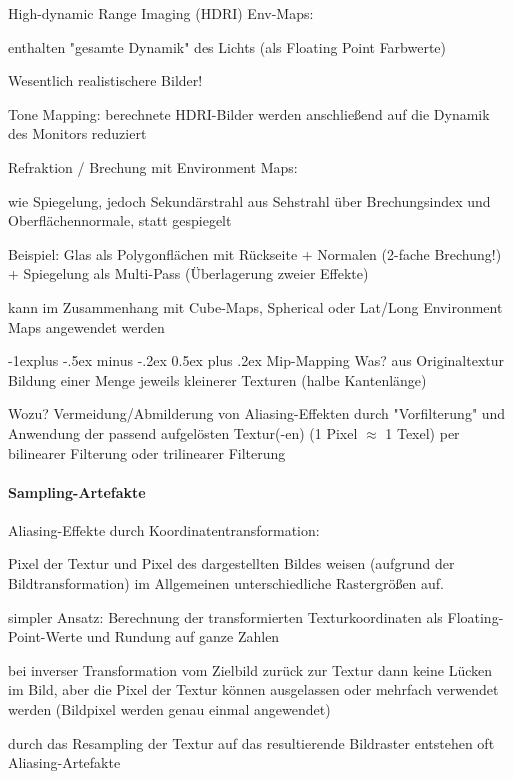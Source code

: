 \documentclass[landscape]{article}
\makeatletter
\renewcommand{\subsection}{\@startsection{subsection}{2}{0mm}%
                                {-1explus -.5ex minus -.2ex}%
                                {0.5ex plus .2ex}%
                                {\normalfont\normalsize\bfseries}}
\makeatother
\begin{document}
\begin{multicols}{3}
  
  High-dynamic Range Imaging (HDRI) Env-Maps:
  \begin{itemize*}
    \item enthalten "gesamte Dynamik" des Lichts (als Floating Point Farbwerte)
    \item Wesentlich realistischere Bilder!
    \item Tone Mapping: berechnete HDRI-Bilder werden anschließend auf die Dynamik des Monitors reduziert
    \item Refraktion / Brechung mit Environment Maps:
    \item wie Spiegelung, jedoch Sekundärstrahl aus Sehstrahl über Brechungsindex und Oberflächennormale, statt gespiegelt
    \item Beispiel: Glas als Polygonflächen mit Rückseite + Normalen (2-fache Brechung!) + Spiegelung als Multi-Pass (Überlagerung zweier Effekte)
    \item kann im Zusammenhang mit Cube-Maps, Spherical oder Lat/Long Environment Maps angewendet werden
  \end{itemize*}
  
  
  \subsection{ Mip-Mapping}
  Was? aus Originaltextur Bildung einer Menge jeweils kleinerer Texturen (halbe Kantenlänge)
  
  Wozu? Vermeidung/Abmilderung von Aliasing-Effekten durch "Vorfilterung" und Anwendung der passend aufgelösten Textur(-en) (1 Pixel $\approx$ 1 Texel) per bilinearer Filterung oder trilinearer Filterung
  
  \paragraph{Sampling-Artefakte}
  Aliasing-Effekte durch Koordinatentransformation:
  \begin{itemize*}
    \item Pixel der Textur und Pixel des dargestellten Bildes weisen (aufgrund der Bildtransformation) im Allgemeinen unterschiedliche Rastergrößen auf.
    \item simpler Ansatz: Berechnung der transformierten Texturkoordinaten als Floating-Point-Werte und Rundung auf ganze Zahlen
    \item bei inverser Transformation vom Zielbild zurück zur Textur dann keine Lücken im Bild, aber die Pixel der Textur können ausgelassen oder mehrfach verwendet werden (Bildpixel werden genau einmal angewendet)
    \item durch das Resampling der Textur auf das resultierende Bildraster entstehen oft Aliasing-Artefakte
  \end{itemize*}
  

\end{multicols}
\end{document}
